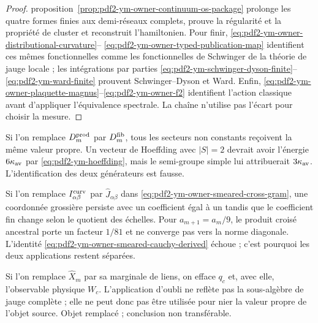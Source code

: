 \begin{proof}
proposition~\ref{prop:pdf2-ym-owner-continuum-os-package} prolonge les
quatre formes finies aux
demi-réseaux complets, prouve la régularité et la propriété de cluster et reconstruit l’hamiltonien. Pour
finir, \eqref{eq:pdf2-ym-owner-distributional-curvature}--
\eqref{eq:pdf2-ym-owner-typed-publication-map} identifient ces mêmes fonctionnelles
comme les fonctionnelles de Schwinger de la théorie de jauge locale ; les intégrations par parties
\eqref{eq:pdf2-ym-schwinger-dyson-finite}--\eqref{eq:pdf2-ym-ward-finite} prouvent
Schwinger--Dyson et Ward. Enfin,
\eqref{eq:pdf2-ym-owner-plaquette-magnus}--\eqref{eq:pdf2-ym-owner-f2} identifient
l’action classique avant d’appliquer l’équivalence spectrale. La chaîne n’utilise pas
l’écart pour choisir la mesure.
\end{proof}

\begin{falsifier}
Si l’on remplace $D_m^{\rm prod}$ par $D_m^{\rm fib}$, tous les secteurs non
constants reçoivent la même valeur propre. Un vecteur de Hoeffding avec $|S|=2$ devrait
avoir l’énergie $6\kappa_{\rm av}$ par \eqref{eq:pdf2-ym-hoeffding}, mais le
semi-groupe simple lui attribuerait $3\kappa_{\rm av}$. L’identification des deux
générateurs est fausse.
\end{falsifier}

\begin{falsifier}
Si l'on remplace $I_{\alpha\beta}^{\rm curv}$ par $\widehat J_{\alpha\beta}$ dans \eqref{eq:pdf2-ym-owner-smeared-cross-gram}, une coordonnée grossière persiste avec un coefficient égal à un tandis que le coefficient fin change selon le quotient des échelles. Pour $a_{m+1}=a_m/9$, le produit croisé ancestral porte un facteur $1/81$ et ne converge pas vers la norme diagonale. L'identité \eqref{eq:pdf2-ym-owner-smeared-cauchy-derived} échoue ; c'est pourquoi les deux applications restent séparées.
\end{falsifier}

\begin{falsifier}
Si l’on remplace $\widehat X_m$ par sa marginale de liens, on efface $q_c$ et, avec elle,
l’observable physique $W_c$. L’application d’oubli ne reflète pas la sous-algèbre de jauge complète ;
elle ne peut donc pas être utilisée pour nier la valeur propre de l’objet source. Objet
remplacé ; conclusion non transférable.
\end{falsifier}

